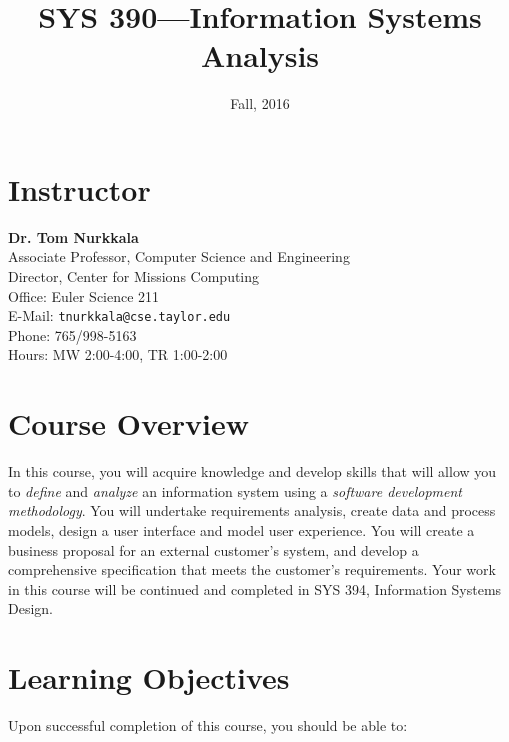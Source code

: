 \documentclass[11pt]{article}
\date{Fall, 2016}
\title{SYS 390---Information Systems Analysis}
\begin{document}
\section{Instructor}
\label{sec:orgheadline1}
\textbf{Dr. Tom Nurkkala}\\
Associate Professor, Computer Science and Engineering\\
Director, Center for Missions Computing\\
Office: Euler Science 211\\
E-Mail: \texttt{tnurkkala@cse.taylor.edu}\\
Phone: 765/998-5163\\
Hours: MW 2:00-4:00, TR 1:00-2:00

\section{Course Overview}
\label{sec:orgheadline2}
In this course, you will acquire knowledge and develop skills
that will allow you to \emph{define} and \emph{analyze} an information system
using a \emph{software development methodology}.
You will
undertake requirements analysis,
create data and process models,
design a user interface
and model user experience.
You will create a business proposal for an external customer's system,
and develop a comprehensive specification that meets the customer's requirements.
Your work in this course will be continued and completed in
SYS 394, Information Systems Design.

\section{Learning Objectives}
\label{sec:orgheadline3}
Upon successful completion of this course, you should be able to:
\end{document}
